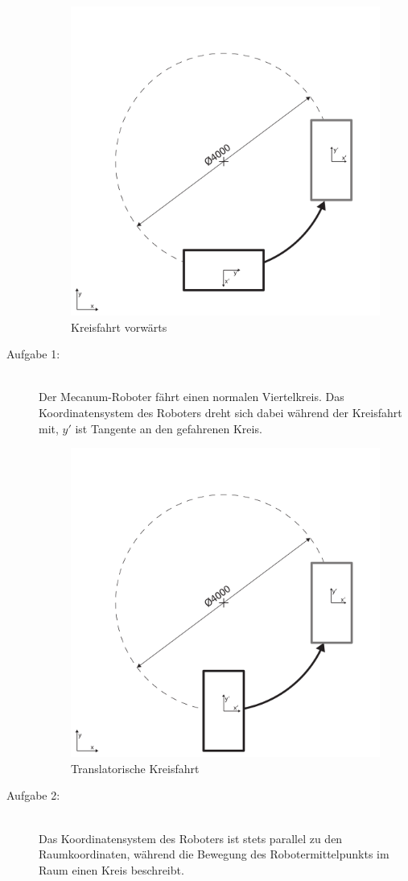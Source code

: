 \begin{description}
    \begin{figure}[H]
        \centering
        \includegraphics[width=.6\textwidth]{Abbildungen/Viertelkreis-vorwaerts}
        \caption{Kreisfahrt vorwärts}
        \label{fig:kreis-vorwaerts}
    \end{figure}
    \item[Aufgabe 1:]~\\
    Der Mecanum-Roboter fährt einen normalen Viertelkreis. Das Koordinatensystem des Roboters dreht sich dabei während der Kreisfahrt mit, $y'$ ist Tangente an den gefahrenen Kreis.

    \begin{figure}[H]
        \centering
        \includegraphics[width=.6\textwidth]{Abbildungen/Viertelkreis-translatorisch}
        \caption{Translatorische Kreisfahrt}
        \label{fig:kreis-translatorisch}
    \end{figure}
    \item[Aufgabe 2:]~\\
    Das Koordinatensystem des Roboters ist stets parallel zu den Raumkoordinaten, während die Bewegung des Robotermittelpunkts im Raum einen Kreis beschreibt.


\end{description}
